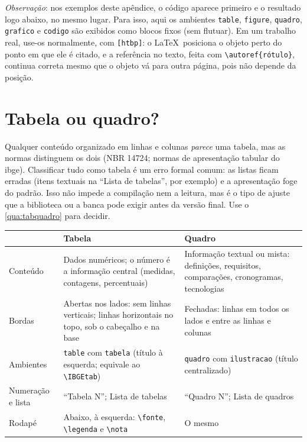 \emph{Observação}: nos exemplos deste apêndice, o código aparece primeiro e o resultado
logo abaixo, no mesmo lugar. Para isso, aqui os ambientes \texttt{table}, \texttt{figure},
\texttt{quadro}, \texttt{grafico} e \texttt{codigo} são exibidos como blocos fixos (sem
flutuar). Em um trabalho real, use-os normalmente, com \texttt{[htbp]}: o \LaTeX\ posiciona
o objeto perto do ponto em que ele é citado, e a referência no texto, feita com
\texttt{\textbackslash autoref\{rótulo\}}, continua correta mesmo que o objeto vá para outra
página, pois não depende da posição.

\section{Tabela ou quadro?}

Qualquer conteúdo organizado em linhas e colunas \emph{parece} uma tabela, mas as normas
distinguem os dois (NBR 14724; normas de apresentação tabular do \ac{ibge}). Classificar
tudo como tabela é um erro formal comum: as listas ficam erradas (itens textuais na
``Lista de tabelas'', por exemplo) e a apresentação foge do padrão. Isso não impede a
compilação nem a leitura, mas é o tipo de ajuste que a biblioteca ou a banca pode
exigir antes da versão final. Use o \autoref{qua:tabquadro} para decidir.

\begin{quadro}[htbp]
\begin{ilustracao}{\caption{Diferenças entre tabela e quadro}\label{qua:tabquadro}}{}
  \renewcommand{\arraystretch}{1.25}
  \small
  \begin{tabularx}{\textwidth}{|>{\raggedright\arraybackslash}p{2.8cm}|X|X|}
    \hline
    & \textbf{Tabela} & \textbf{Quadro} \\
    \hline
    Conteúdo & Dados numéricos; o número é a informação central (medidas, contagens, percentuais) & Informação textual ou mista: definições, requisitos, comparações, cronogramas, tecnologias \\
    \hline
    Bordas & Abertas nos lados: sem linhas verticais; linhas horizontais no topo, sob o cabeçalho e na base & Fechadas: linhas em todos os lados e entre as linhas e colunas \\
    \hline
    Ambientes & \texttt{table} com \texttt{tabela} (título à esquerda; equivale ao \texttt{\textbackslash IBGEtab}) & \texttt{quadro} com \texttt{ilustracao} (título centralizado) \\
    \hline
    Numeração e lista & ``Tabela N''; Lista de tabelas & ``Quadro N''; Lista de quadros \\
    \hline
    Rodapé & Abaixo, à esquerda: \texttt{\textbackslash fonte}, \texttt{\textbackslash legenda} e \texttt{\textbackslash nota} & O mesmo \\
    \hline
  \end{tabularx}
\end{ilustracao}
\end{quadro}

